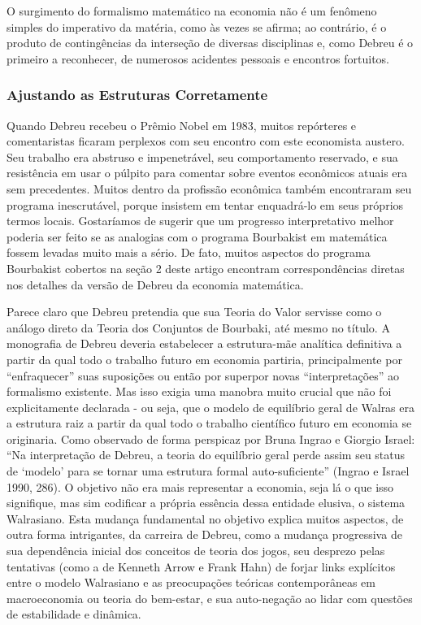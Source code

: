 \documentclass[a4paper,12pt]{article}[abntex2]
\begin{document}
O surgimento do formalismo matemático na economia não é um fenômeno simples do imperativo da matéria, como às vezes se afirma; ao contrário, é o produto de contingências da interseção de diversas disciplinas e, como Debreu é o primeiro a reconhecer, de numerosos acidentes pessoais e encontros fortuitos.

\subsubsection{\textbf{Ajustando as Estruturas Corretamente}}
Quando Debreu recebeu o Prêmio Nobel em 1983, muitos repórteres e comentaristas ficaram perplexos com seu encontro com este economista austero. Seu trabalho era abstruso e impenetrável, seu comportamento reservado, e sua resistência em usar o púlpito para comentar sobre eventos econômicos atuais era sem precedentes. Muitos dentro da profissão econômica também encontraram seu programa inescrutável, porque insistem em tentar enquadrá-lo em seus próprios termos locais. Gostaríamos de sugerir que um progresso interpretativo melhor poderia ser feito se as analogias com o programa Bourbakist em matemática fossem levadas muito mais a sério. De fato, muitos aspectos do programa Bourbakist cobertos na seção 2 deste artigo encontram correspondências diretas nos detalhes da versão de Debreu da economia matemática.

Parece claro que Debreu pretendia que sua Teoria do Valor servisse como o análogo direto da Teoria dos Conjuntos de Bourbaki, até mesmo no título. A monografia de Debreu deveria estabelecer a estrutura-mãe analítica definitiva a partir da qual todo o trabalho futuro em economia partiria, principalmente por “enfraquecer” suas suposições ou então por superpor novas “interpretações” ao formalismo existente. Mas isso exigia uma manobra muito crucial que não foi explicitamente declarada - ou seja, que o modelo de equilíbrio geral de Walras era a estrutura raiz a partir da qual todo o trabalho científico futuro em economia se originaria. Como observado de forma perspicaz por Bruna Ingrao e Giorgio Israel: “Na interpretação de Debreu, a teoria do equilíbrio geral perde assim seu status de ‘modelo’ para se tornar uma estrutura formal auto-suficiente” (Ingrao e Israel 1990, 286). O objetivo não era mais representar a economia, seja lá o que isso signifique, mas sim codificar a própria essência dessa entidade elusiva, o sistema Walrasiano. Esta mudança fundamental no objetivo explica muitos aspectos, de outra forma intrigantes, da carreira de Debreu, como a mudança progressiva de sua dependência inicial dos conceitos de teoria dos jogos, seu desprezo pelas tentativas (como a de Kenneth Arrow e Frank Hahn) de forjar links explícitos entre o modelo Walrasiano e as preocupações teóricas contemporâneas em macroeconomia ou teoria do bem-estar, e sua auto-negação ao lidar com questões de estabilidade e dinâmica.
\end{document}
